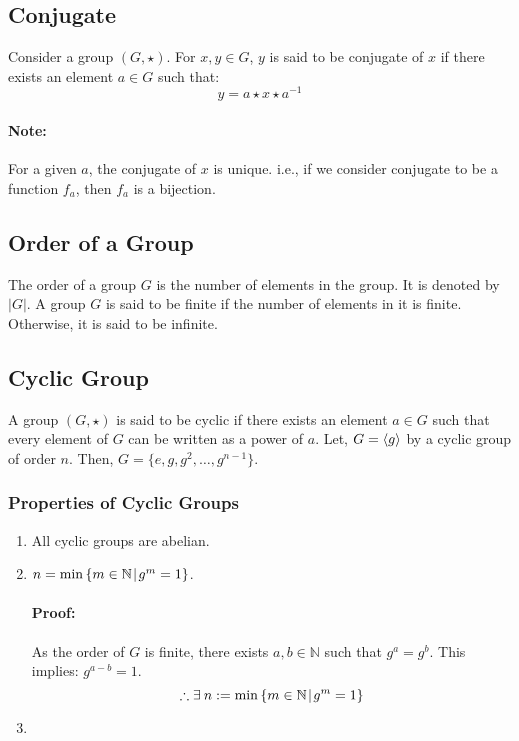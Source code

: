 \documentclass[12pt, oneside]{book}
\DeclarePairedDelimiter{\evdel}{\langle}{\rangle}
\newcommand{\ev}{\evdel}
\begin{document}
\subsection{Conjugate}
Consider a group \( \left(G, \star \right) \).
For \(x,y \in G\), \(y\) is said to be conjugate of \(x\) if there exists an element \(a \in G\) such that:
\[ y = a \star x \star a^{-1} \]
\paragraph{Note:} For a given \(a\), the conjugate of \(x\) is unique.
i.e., if we consider conjugate to be a function \(f_a\), then \(f_a\) is a bijection.

\subsection{Order of a Group}
The order of a group \(G\) is the number of elements in the group.
It is denoted by \(|G|\).
A group \(G\) is said to be finite if the number of elements in it is finite.
Otherwise, it is said to be infinite.

\subsection{Cyclic Group}
A group \( \left(G, \star \right) \) is said to be cyclic if there exists an element \(a \in G\) such that every element of \(G\) can be written as a power of \(a\).
Let, \(G = \ev{g}\) by a cyclic group of order \(n\).
Then, \(G = \{e, g, g^2, \ldots, g^{n-1}\}\).
\subsubsection{Properties of Cyclic Groups}
\begin{enumerate}
	\item All cyclic groups are abelian.
	\item \(n = \min{ \left\{m \in \mathbb{N} \: \vline \: g^m = 1\right\} }\).

	      \paragraph{Proof:} As the order of \(G\) is finite, there exists \(a,b \in \mathbb{N}\) such that \(g^a = g^b\).
	      This implies: \(g^{a-b} = 1\).
	      \[ \therefore \exists \: n := \min{ \left\{m \in \mathbb{N} \: \vline \: g^m = 1\right\} } \]

	\item
\end{enumerate}
\end{document}
